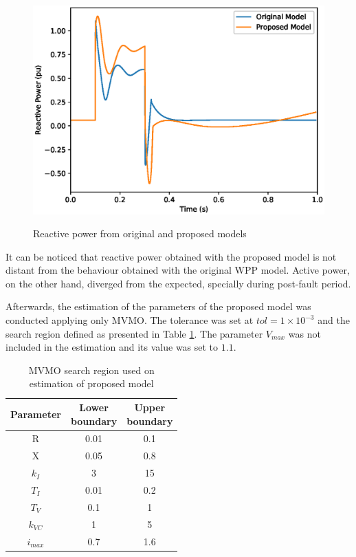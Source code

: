 \begin{figure}[!h]
	\centering
	\caption{Reactive power from original and proposed models}
	\includegraphics[scale=.7]{Images/Q_proposed.eps}
	\label{fig: proposed_Q}
\end{figure}

It can be noticed that reactive power obtained with the proposed model is not distant from the behaviour obtained with the original WPP model. Active power, on the other hand, diverged from the expected, specially during post-fault period. 

Afterwards, the estimation of the parameters of the proposed model was conducted applying only MVMO. The tolerance was set at $tol = 1\times 10^{-3}$ and the search region defined as presented in Table \ref{tab: MVMO_boundaries_proposed}. The parameter $V_{max}$ was not included in the estimation and its value was set to $1.1$.

\begin{table}[!h]
	\centering
	\caption{MVMO search region used on estimation of proposed model}
	\begin{tabular}{c|cc}
		Parameter & \shortstack{Lower \\ boundary} & \shortstack{Upper \\ boundary} \\\hline
		R & 0.01 & 0.1 \\
		X & 0.05 & 0.8 \\
		$k_{I}$ & 3 & 15 \\
		$T_{I}$ & 0.01 & 0.2 \\
		$T_{V}$ & 0.1 & 1 \\
		$k_{VC}$ & 1 & 5 \\
		$i_{max}$ & 0.7 & 1.6
	\end{tabular}
	\label{tab: MVMO_boundaries_proposed}
\end{table}

